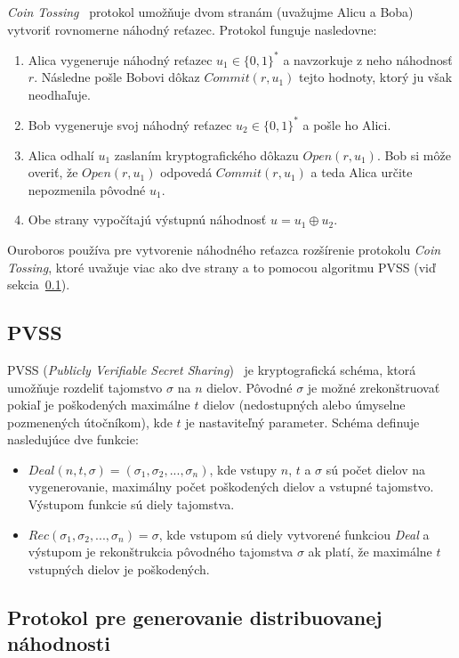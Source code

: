 \textit{Coin Tossing}~\cite{coinFlipBlum} protokol umožňuje dvom stranám (uvažujme Alicu a Boba) vytvoriť rovnomerne náhodný reťazec. Protokol funguje nasledovne:
\begin{enumerate}
	\item Alica vygeneruje náhodný reťazec $u_1 \in \{0,1\}^*$ a navzorkuje z neho náhodnosť $r$. Následne pošle Bobovi dôkaz $Commit(r,u_1)$ tejto hodnoty, ktorý ju však neodhaľuje.
	\item Bob vygeneruje svoj náhodný reťazec $u_2 \in \{0,1\}^*$ a pošle ho Alici. 
	\item Alica odhalí $u_1$ zaslaním kryptografického dôkazu $Open(r,u_1)$. Bob si môže overiť, že $Open(r,u_1)$ odpovedá $Commit(r,u_1)$ a teda Alica určite nepozmenila pôvodné $u_1$.
	\item Obe strany vypočítajú výstupnú náhodnosť $u = u_1 \oplus u_2$.
\end{enumerate}

Ouroboros používa pre vytvorenie náhodného reťazca rozšírenie protokolu \textit{Coin Tossing}, ktoré uvažuje viac ako dve strany a to pomocou algoritmu PVSS (viď sekcia~\ref{subsec:ouroboros-pvss}).

\subsection{PVSS}\label{subsec:ouroboros-pvss}

PVSS (\textit{Publicly Verifiable Secret Sharing})~\cite{pvssFeldman} je kryptografická schéma, ktorá umožňuje rozdeliť tajomstvo $\sigma$ na $n$ dielov. Pôvodné $\sigma$ je možné zrekonštruovať pokiaľ je poškodených maximálne $t$ dielov (nedostupných alebo úmyselne pozmenených útočníkom), kde $t$ je nastaviteľný parameter. Schéma definuje nasledujúce dve funkcie:
\begin{itemize}
	\item $Deal(n, t, \sigma) = (\sigma_1, \sigma_2, ..., \sigma_n)$, kde vstupy $n$, $t$ a $\sigma$ sú počet dielov na vygenerovanie, maximálny počet poškodených dielov a vstupné tajomstvo. Výstupom funkcie sú diely tajomstva.
	\item $Rec(\sigma_1, \sigma_2, ..., \sigma_n) = \sigma$, kde vstupom sú diely vytvorené funkciou \textit{Deal} a výstupom je rekonštrukcia pôvodného tajomstva $\sigma$ ak platí, že maximálne $t$ vstupných dielov je poškodených.
\end{itemize}

\subsection{Protokol pre generovanie distribuovanej náhodnosti}
 
